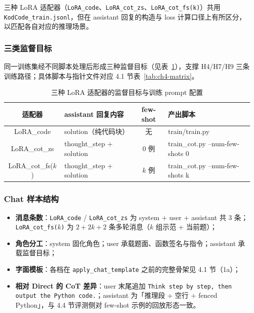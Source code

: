 
三种 LoRA 适配器（\texttt{LoRA\_code}、\texttt{LoRA\_cot\_zs}、\texttt{LoRA\_cot\_fs(k)}）共用 \texttt{KodCode\_train.jsonl}，但在 assistant 回复的构造与 loss 计算口径上有所区分，以匹配各自对应的推理场景。

\subsubsection{三类监督目标}
同一训练集经不同脚本处理后形成三种监督目标（见表~\ref{tab:ch4-lora-target}），支撑 H4/H7/H9 三条训练路径；具体脚本与指针文件对应 4.1 节表~\ref{tab:ch4-matrix}。
\begin{table}[!htb]
  \centering
  \caption{三种 LoRA 适配器的监督目标与训练 prompt 配置}
  \label{tab:ch4-lora-target}
  \footnotesize
  \setlength{\tabcolsep}{5pt}
  \renewcommand{\arraystretch}{1.2}
  \begin{tabular}{c l c p{5cm}}
    \toprule
    适配器 & assistant 回复内容 & few-shot & 产出脚本 \\
    \midrule
    LoRA\_code  &  solution（纯代码块）  &  无  &  train/train.py \\
    LoRA\_cot\_zs  &  thought\_step + solution  &  0 例  &  train\_cot.py --num-few-shots 0 \\
    LoRA\_cot\_fs($k$)  &  thought\_step + solution  &  $k$ 例  &  train\_cot.py --num-few-shots k \\
    \bottomrule
  \end{tabular}
\end{table}


\subsubsection{Chat 样本结构}
\begin{itemize}
    \item \textbf{消息条数}：\texttt{LoRA\_code} / \texttt{LoRA\_cot\_zs} 为 system + user + assistant 共 3 条；\texttt{LoRA\_cot\_fs($k$)} 为 $2{+}2k{+}2$ 条多轮消息（$k$ 组示范 + 当前题）；
    \item \textbf{角色分工}：system 固化角色；user 承载题面、函数签名与指令；assistant 承载监督目标；
    \item \textbf{字面模板}：各档在 \texttt{apply\_chat\_template} 之前的完整骨架见 4.1 节（1a）；
    \item \textbf{相对 Direct 的 CoT 差异}：user 末尾追加 \texttt{Think step by step, then output the Python code.}；assistant 为「推理段 + 空行 + fenced Python」，与 4.4 节评测侧对 few-shot 示例的回放形态一致。
\end{itemize}

